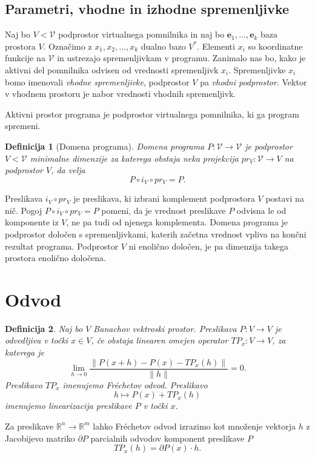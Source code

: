 \documentclass{article}
\newcommand{\RR}{\mathbb{R}}
\newcommand{\VV}{\mathcal{V}}
\newcommand{\e}{\mathbf{e}}
\newcommand{\D}{\partial}
\newtheorem{definicija}{Definicija}[section]
\begin{document}
\subsection{Parametri, vhodne in izhodne spremenljivke}
Naj bo $V<\VV$ podprostor virtualnega pomnilnika in naj bo ${\e_1,\ldots,\e_k}$
baza prostora $V$. Označimo z ${x_1,x_2,\ldots,x_k}$ dualno bazo $V^*$. Elementi $x_i$
so koordinatne funkcije na $\VV$ in ustrezajo spremenljivkam v programu.
Zanimalo nas bo, kako je aktivni del pomnilnika odvisen od vrednosti
spremenljivk $x_i$. Spremenljivke $x_i$ bomo imenovali \emph{vhodne
  spremenljivke}, podprostor $V$ pa \emph{vhodni podprostor}. Vektor v vhodnem
prostoru je nabor vrednosti vhodnih spremenljivk.
 
Aktivni prostor programa je podprostor virtualnega pomnilnika, ki ga program
spremeni. 
\begin{definicija}[Domena programa]
  \emph{Domena programa $P:\VV\to\VV$} je podprostor $V<\VV$ minimalne dimenzije za
  katerega obstaja neka projekcija $pr_V:\VV\to V$ na podprostor $V$, 
  da velja 
  $$P\circ i_V\circ pr_V=P.$$ 
\end{definicija}
Preslikava $i_V\circ pr_V$ je preslikava, ki izbrani komplement podprostora $V$
postavi na nič. Pogoj $P\circ i_V\circ pr_V=P$ pomeni, da je vrednost preslikave
$P$ odvisna le od komponente iz $V$, ne pa tudi od njenega komplementa. Domena
programa je podprostor določen s spremenljivkami, katerih začetna vrednost
vpliva na končni rezultat programa. Podprostor $V$ ni enolično določen, je pa
dimenzija takega prostora enolično določena.
\section{Odvod}
\begin{definicija}
  Naj bo $V$ Banachov vektroski prostor. Preslikava $P:V\to V$ je odvedljiva v
  točki $x\in V$, če obstaja
  linearen omejen operator $TP_x:V\to V$, za katerega je
  \begin{equation}
    \label{eq:frechet}
    \lim_{h\to 0}\frac{\|P(x+h)-P(x)-TP_x(h)\|}{\|h\|} = 0.
  \end{equation}
  Preslikavo $TP_x$ imenujemo \emph{Fréchetov odvod}. Preslikavo 
  \begin{equation}
    \label{eq:linearizacija}
    h\mapsto P(x)+TP_x(h)
  \end{equation}
 imenujemo \emph{linearizacija} preslikave $P$ v točki $x$.
\end{definicija}
Za preslikave $\RR^n\to \RR^m$ lahko Fréchetov odvod
izrazimo kot množenje vektorja $h$ z Jacobijevo matriko $\D P$ parcialnih odvodov
komponent preslikave $P$
\begin{equation*}
  TP_x(h) = \D P(x)\cdot h.
\end{equation*}
\end{document}
